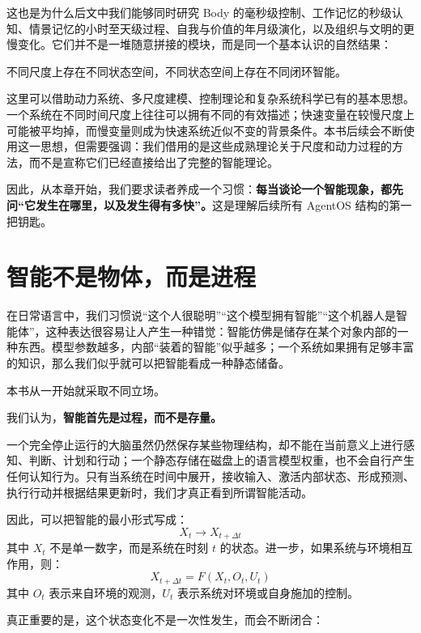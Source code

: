 这也是为什么后文中我们能够同时研究 Body 的毫秒级控制、工作记忆的秒级认知、情景记忆的小时至天级过程、自我与价值的年月级演化，以及组织与文明的更慢变化。它们并不是一堆随意拼接的模块，而是同一个基本认识的自然结果：

\begin{statementbox}
不同尺度上存在不同状态空间，不同状态空间上存在不同闭环智能。
\end{statementbox}

这里可以借助动力系统、多尺度建模、控制理论和复杂系统科学已有的基本思想。一个系统在不同时间尺度上往往可以拥有不同的有效描述；快速变量在较慢尺度上可能被平均掉，而慢变量则成为快速系统近似不变的背景条件。本书后续会不断使用这一思想，但需要强调：我们借用的是这些成熟理论关于尺度和动力过程的方法，而不是宣称它们已经直接给出了完整的智能理论。

因此，从本章开始，我们要求读者养成一个习惯：\textbf{每当谈论一个智能现象，都先问“它发生在哪里，以及发生得有多快”。}这是理解后续所有 AgentOS 结构的第一把钥匙。

\section{智能不是物体，而是进程}

在日常语言中，我们习惯说“这个人很聪明”“这个模型拥有智能”“这个机器人是智能体”，这种表达很容易让人产生一种错觉：智能仿佛是储存在某个对象内部的一种东西。模型参数越多，内部“装着的智能”似乎越多；一个系统如果拥有足够丰富的知识，那么我们似乎就可以把智能看成一种静态储备。

本书从一开始就采取不同立场。

我们认为，\textbf{智能首先是过程，而不是存量。}

一个完全停止运行的大脑虽然仍然保存某些物理结构，却不能在当前意义上进行感知、判断、计划和行动；一个静态存储在磁盘上的语言模型权重，也不会自行产生任何认知行为。只有当系统在时间中展开，接收输入、激活内部状态、形成预测、执行行动并根据结果更新时，我们才真正看到所谓智能活动。

因此，可以把智能的最小形式写成：
\[
\boxed{
X_t
\rightarrow
X_{t+\Delta t}
}
\]
其中 \(X_t\) 不是单一数字，而是系统在时刻 \(t\) 的状态。进一步，如果系统与环境相互作用，则：
\[
X_{t+\Delta t}
=
F(X_t,O_t,U_t)
\]
其中 \(O_t\) 表示来自环境的观测，\(U_t\) 表示系统对环境或自身施加的控制。

真正重要的是，这个状态变化不是一次性发生，而会不断闭合：
\begin{statementbox}
\centering
{}
\end{statementbox}

